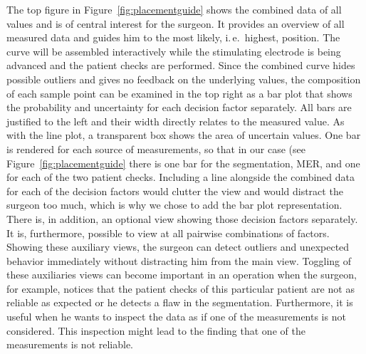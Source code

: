 \documentclass[review]{vgtc}                 %
\begin{document}
The top figure in Figure~\ref{fig:placementguide} shows the combined data of all values and is of central interest for the surgeon. It provides an overview of all measured data and guides him to the most likely, i.\,e.~highest, position. The curve will be assembled interactively while the stimulating electrode is being advanced and the patient checks are performed. Since the combined curve hides possible outliers and gives no feedback on the underlying values, the composition of each sample point can be examined in the top right as a bar plot that shows the probability and uncertainty for each decision factor separately. All bars are justified to the left and their width directly relates to the measured value. As with the line plot, a transparent box shows the area of uncertain values. One bar is rendered for each source of measurements, so that in our case (see Figure~\ref{fig:placementguide} there is one bar for the segmentation, MER, and one for each of the two patient checks. Including a line alongside the combined data for each of the decision factors would clutter the view and would distract the surgeon too much, which is why we chose to add the bar plot representation. There is, in addition, an optional view showing those decision factors separately. It is, furthermore, possible to view at all pairwise combinations of factors. Showing these auxiliary views, the surgeon can detect outliers and unexpected behavior immediately without distracting him from the main view. Toggling of these auxiliaries views can become important in an operation when the surgeon, for example, notices that the patient checks of this particular patient are not as reliable as expected or he detects a flaw in the segmentation. Furthermore, it is useful when he wants to inspect the data as if one of the measurements is not considered. This inspection might lead to the finding that one of the measurements is not reliable.

\end{document}
